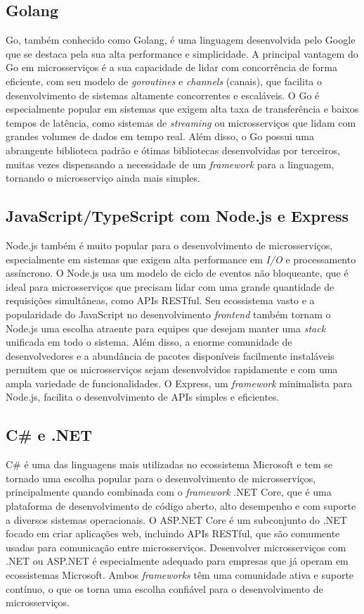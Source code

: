 \subsection{Golang}

Go, também conhecido como Golang, é uma linguagem desenvolvida pelo Google que se destaca pela sua alta performance e simplicidade. A principal vantagem do Go em microsserviços é a sua capacidade de lidar com concorrência de forma eficiente, com seu modelo de \emph{goroutines} e \emph{channels} (canais), que facilita o desenvolvimento de sistemas altamente concorrentes e escaláveis. O Go é especialmente popular em sistemas que exigem alta taxa de transferência e baixos tempos de latência, como sistemas de \emph{streaming} ou microsserviços que lidam com grandes volumes de dados em tempo real. Além disso, o Go possui uma abrangente biblioteca padrão e ótimas bibliotecas desenvolvidas por terceiros, muitas vezes dispensando a necessidade de um \emph{framework} para a linguagem, tornando o microsserviço ainda mais simples.
\cite{golang}

\subsection{JavaScript/TypeScript com Node.js e Express}

Node.js também é muito popular para o desenvolvimento de microsserviços, especialmente em sistemas que exigem alta performance em \emph{I/O} e processamento assíncrono. O Node.js usa um modelo de ciclo de eventos não bloqueante, que é ideal para microsserviços que precisam lidar com uma grande quantidade de requisições simultâneas, como APIs RESTful. Seu ecossistema vasto e a popularidade do JavaScript no desenvolvimento \emph{frontend} também tornam o Node.js uma escolha atraente para equipes que desejam manter uma \emph{stack} unificada em todo o sistema. Além disso, a enorme comunidade de desenvolvedores e a abundância de pacotes disponíveis facilmente instaláveis permitem que os microsserviços sejam desenvolvidos rapidamente e com uma ampla variedade de funcionalidades. O Express, um \emph{framework} minimalista para Node.js, facilita o desenvolvimento de APIs simples e eficientes. 
\cite{expressjs,nodejs}

\subsection{C\# e .NET}

C\# é uma das linguagens mais utilizadas no ecossistema Microsoft e tem se tornado uma escolha popular para o desenvolvimento de microsserviços, principalmente quando combinada com o \emph{framework} .NET Core, que é uma plataforma de desenvolvimento de código aberto, alto desempenho e com suporte a diversos sistemas operacionais. O ASP.NET Core é um subconjunto do .NET focado em criar aplicações web, incluindo APIs RESTful, que são comumente usadas para comunicação entre microsserviços. Desenvolver microsserviços com .NET ou ASP.NET é especialmente adequado para empresas que já operam em ecossistemas Microsoft. Ambos \emph{frameworks} têm uma comunidade ativa e suporte contínuo, o que os torna uma escolha confiável para o desenvolvimento de microsserviços. 
\cite{dotnetcore,aspnetcore}

